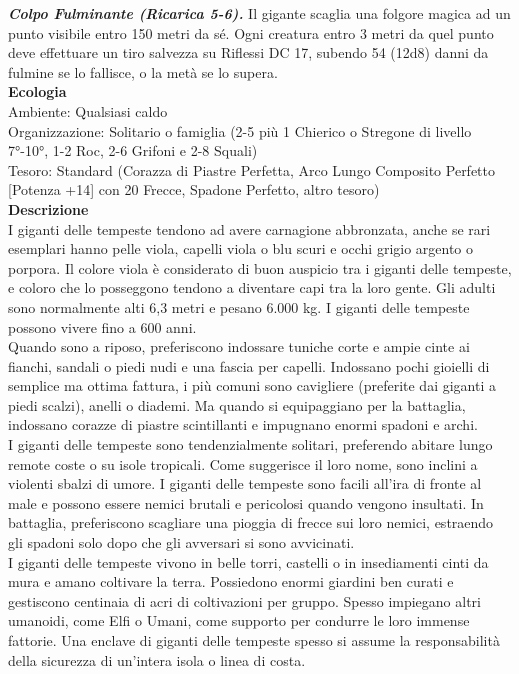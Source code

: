 \begin{multicols}{2}
\emph{\textbf{Colpo Fulminante (Ricarica 5-6).}} Il gigante scaglia una folgore magica ad un punto visibile entro 150 metri da sé. Ogni creatura entro 3 metri da quel punto deve effettuare un tiro salvezza su Riflessi DC 17, subendo 54 (12d8) danni da fulmine se lo fallisce, o la metà se lo supera.\\
\textbf{Ecologia}\\
Ambiente: Qualsiasi caldo\\
Organizzazione: Solitario o famiglia (2-5 più 1 Chierico o Stregone di livello 7°-10°, 1-2 Roc, 2-6 Grifoni e 2-8 Squali)\\
Tesoro: Standard (Corazza di Piastre Perfetta, Arco Lungo Composito Perfetto [Potenza +14] con 20 Frecce, Spadone Perfetto, altro tesoro)\\
\textbf{Descrizione}\\
I giganti delle tempeste tendono ad avere carnagione abbronzata, anche se rari esemplari hanno pelle viola, capelli viola o blu scuri e occhi grigio argento o porpora. Il colore viola è considerato di buon auspicio tra i giganti delle tempeste, e coloro che lo posseggono tendono a diventare capi tra la loro gente. Gli adulti sono normalmente alti 6,3 metri e pesano 6.000 kg. I giganti delle tempeste possono vivere fino a 600 anni.\\

Quando sono a riposo, preferiscono indossare tuniche corte e ampie cinte ai fianchi, sandali o piedi nudi e una fascia per capelli. Indossano pochi gioielli di semplice ma ottima fattura, i più comuni sono cavigliere (preferite dai giganti a piedi scalzi), anelli o diademi. Ma quando si equipaggiano per la battaglia, indossano corazze di piastre scintillanti e impugnano enormi spadoni e archi.\\

I giganti delle tempeste sono tendenzialmente solitari, preferendo abitare lungo remote coste o su isole tropicali. Come suggerisce il loro nome, sono inclini a violenti sbalzi di umore. I giganti delle tempeste sono facili all’ira di fronte al male e possono essere nemici brutali e pericolosi quando vengono insultati. In battaglia, preferiscono scagliare una pioggia di frecce sui loro nemici, estraendo gli spadoni solo dopo che gli avversari si sono avvicinati.\\

I giganti delle tempeste vivono in belle torri, castelli o in insediamenti cinti da mura e amano coltivare la terra. Possiedono enormi giardini ben curati e gestiscono centinaia di acri di coltivazioni per gruppo. Spesso impiegano altri umanoidi, come Elfi o Umani, come supporto per condurre le loro immense fattorie. Una enclave di giganti delle tempeste spesso si assume la responsabilità della sicurezza di un’intera isola o linea di costa.\\


\end{multicols}
